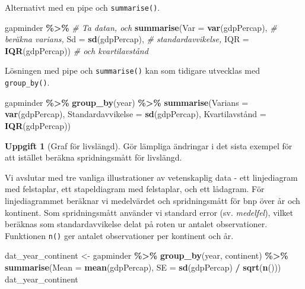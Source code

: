 \documentclass[
]{book}
\newenvironment{Shaded}{\begin{snugshade}}{\end{snugshade}}
\newcommand{\AttributeTok}[1]{\textcolor[rgb]{0.13,0.29,0.53}{#1}}
\newcommand{\CommentTok}[1]{\textcolor[rgb]{0.56,0.35,0.01}{\textit{#1}}}
\newcommand{\FunctionTok}[1]{\textcolor[rgb]{0.13,0.29,0.53}{\textbf{#1}}}
\newcommand{\NormalTok}[1]{#1}
\newcommand{\OtherTok}[1]{\textcolor[rgb]{0.56,0.35,0.01}{#1}}
\newcommand{\SpecialCharTok}[1]{\textcolor[rgb]{0.81,0.36,0.00}{\textbf{#1}}}
\theoremstyle{definition}
\theoremstyle{definition}
\theoremstyle{definition}
\newtheorem{exercise}{Uppgift}[chapter]
\theoremstyle{definition}
\theoremstyle{remark}
\begin{document}
Alternativt med en pipe och \texttt{summarise()}.

\begin{Shaded}
\begin{Highlighting}[]
\NormalTok{gapminder }\SpecialCharTok{\%\textgreater{}\%}                       \CommentTok{\# Ta datan, och}
  \FunctionTok{summarise}\NormalTok{(}\AttributeTok{Var =} \FunctionTok{var}\NormalTok{(gdpPercap),   }\CommentTok{\# beräkna varians,}
            \AttributeTok{Sd =} \FunctionTok{sd}\NormalTok{(gdpPercap),     }\CommentTok{\# standardavvikelse,}
            \AttributeTok{IQR =} \FunctionTok{IQR}\NormalTok{(gdpPercap))   }\CommentTok{\# och kvartilavstånd}
\end{Highlighting}
\end{Shaded}

Lösningen med pipe och \texttt{summarise()} kan som tidigare utvecklas med \texttt{group\_by()}.

\begin{Shaded}
\begin{Highlighting}[]
\NormalTok{gapminder }\SpecialCharTok{\%\textgreater{}\%}
  \FunctionTok{group\_by}\NormalTok{(year) }\SpecialCharTok{\%\textgreater{}\%}
  \FunctionTok{summarise}\NormalTok{(}\AttributeTok{Varians =} \FunctionTok{var}\NormalTok{(gdpPercap),}
            \AttributeTok{Standardavvikelse =} \FunctionTok{sd}\NormalTok{(gdpPercap),}
\NormalTok{            Kvartilavstånd }\OtherTok{=} \FunctionTok{IQR}\NormalTok{(gdpPercap))}
\end{Highlighting}
\end{Shaded}

\begin{exercise}[Graf för livslängd]
Gör lämpliga ändringar i det sista exempel för att istället beräkna spridningsmått för livslängd.
\end{exercise}

Vi avslutar med tre vanliga illustrationer av vetenskaplig data - ett linjediagram med felstaplar, ett stapeldiagram med felstaplar, och ett lådagram. För linjediagrammet beräknar vi medelvärdet och spridningsmått för bnp över år och kontinent. Som spridningsmått använder vi standard error (sv. \emph{medelfel}), vilket beräknas som standardavvikelse delat på roten ur antalet observationer. Funktionen \texttt{n()} ger antalet observationer per kontinent och år.

\begin{Shaded}
\begin{Highlighting}[]
\NormalTok{dat\_year\_continent }\OtherTok{\textless{}{-}}\NormalTok{ gapminder }\SpecialCharTok{\%\textgreater{}\%}
  \FunctionTok{group\_by}\NormalTok{(year, continent) }\SpecialCharTok{\%\textgreater{}\%}
  \FunctionTok{summarise}\NormalTok{(}\AttributeTok{Mean =} \FunctionTok{mean}\NormalTok{(gdpPercap),}
            \AttributeTok{SE =} \FunctionTok{sd}\NormalTok{(gdpPercap) }\SpecialCharTok{/} \FunctionTok{sqrt}\NormalTok{(}\FunctionTok{n}\NormalTok{()))}
\NormalTok{dat\_year\_continent}
\end{Highlighting}
\end{Shaded}
\end{document}
